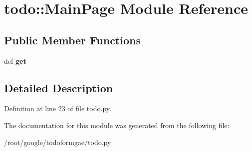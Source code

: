 \hypertarget{moduletodo_1_1_main_page}{
\section{todo::MainPage Module Reference}
\label{moduletodo_1_1_main_page}
}
\subsection*{Public Member Functions}
\begin{DoxyCompactItemize}
\item 
\hypertarget{moduletodo_1_1_main_page_a06ed30405274379d98e426b78f0bc417}{
def {\bfseries get}}
\label{moduletodo_1_1_main_page_a06ed30405274379d98e426b78f0bc417}

\end{DoxyCompactItemize}


\subsection{Detailed Description}


Definition at line 23 of file todo.py.

The documentation for this module was generated from the following file:\begin{DoxyCompactItemize}
\item 
/root/google/todoformgae/todo.py\end{DoxyCompactItemize}
